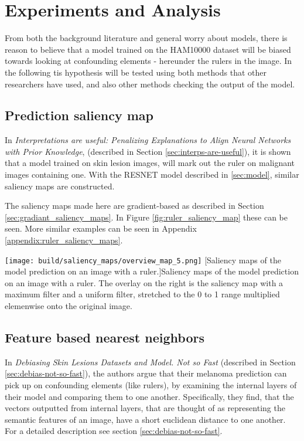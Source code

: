 \chapter{Experiments and Analysis}\label{sec:testing-the-hypothesis}
From both the background literature and general worry about models,
there is reason to believe that a model trained on the HAM10000 dataset will be biased
towards looking at confounding elements - hereunder the rulers in the image.
In the following tis hypothesis will be tested using both methods that other researchers have used,
and also other methods checking the output of the model.

\section{Prediction saliency map}\label{sec:prediction-saliency-map}
In \textit{Interpretations are useful: Penalizing Explanations to Align Neural Networks with Prior Knowledge}\cite{interps-are-useful},
(described in Section \ref{sec:interps-are-useful}), it is shown that a model trained on skin lesion images,
will mark out the ruler on malignant images containing one.
With the RESNET model described in \ref{sec:model}, similar saliency maps are constructed.

The saliency maps made here are gradient-based as described in Section \ref{sec:gradiant_saliency_maps}.
In Figure \ref{fig:ruler_saliency_map} these can be seen.
More similar examples can be seen in Appendix \ref{appendix:ruler_saliency_maps}.

\begin{center}
    \texttt{[image: build/saliency\_maps/overview\_map\_5.png]}
    [Saliency maps of the model prediction on an image with a ruler.]{Saliency maps of the model prediction on an image with a ruler.
        The overlay on the right is the saliency map with a maximum filter and a uniform filter,
        stretched to the 0 to 1 range multiplied elemenwise onto the original image.
    }
    \label{fig:ruler_saliency_map}
\end{center}

\section{Feature based nearest neighbors}
In \textit{Debiasing Skin Lesions Datasets and Model. Not so Fast}\cite{debias-not-so-fast} (described in Section \ref{sec:debias-not-so-fast}),
the authors argue that their melanoma prediction can pick up on confounding elements (like rulers),
by examining the internal layers of their model and comparing them to one another.
Specifically, they find, that the vectors outputted from internal layers,
that are thought of as representing the semantic features of an image,
have a short euclidean distance to one another.
For a detailed description see section \ref{sec:debias-not-so-fast}.

